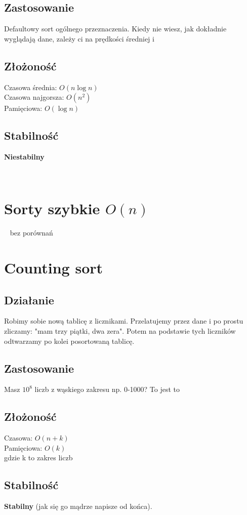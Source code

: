 \documentclass[12pt]{article}
\begin{document}
\subsection{Zastosowanie}
Defaultowy sort ogólnego przeznaczenia. Kiedy nie wiesz, jak dokładnie wyglądają dane, zależy ci na prędkości średniej i 
\subsection{Złożoność}
Czasowa średnia: $O(n \log n)$\\
Czasowa najgorsza: $O(n^2)$\\
Pamięciowa: $O(\log n)$
\subsection{Stabilność}
\textbf{Niestabilny} 

\begin{center}
  \section*{Sorty szybkie $O(n)$}
  bez porównań
\end{center}

\section{Counting sort}
\subsection{Działanie}
Robimy sobie nową tablicę z licznikami. Przelatujemy przez dane i po prostu zliczamy: "mam trzy piątki, dwa zera". Potem na podstawie tych liczników odtwarzamy po kolei posortowaną tablicę.
\subsection{Zastosowanie}
Masz $10^8$ liczb z wąskiego zakresu np. 0-1000? To jest to
\subsection{Złożoność}
Czasowa: $O(n+k)$\\
Pamięciowa: $O(k)$\\
gdzie k to zakres liczb
\subsection{Stabilność}
\textbf{Stabilny} (jak się go mądrze napisze od końca).
\end{document}
